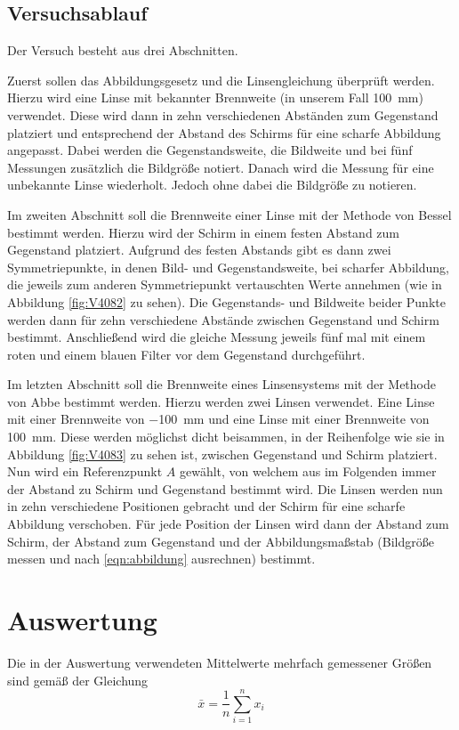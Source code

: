 \documentclass[
  parskip=half,
  bibliography=totoc,     %
  captions=tableheading,  %
  titlepage=firstiscover, %
]{scrartcl}
\begin{document}
\subsection{Versuchsablauf}
Der Versuch besteht aus drei Abschnitten.

\noindent
Zuerst sollen das Abbildungsgesetz und die Linsengleichung überprüft werden.
Hierzu wird eine Linse mit bekannter Brennweite (in unserem Fall \SI{100}{\milli\meter})
verwendet. Diese wird dann in zehn verschiedenen Abständen zum Gegenstand
platziert und entsprechend der Abstand des Schirms für eine scharfe Abbildung
angepasst. Dabei werden die Gegenstandsweite, die Bildweite und bei fünf
Messungen zusätzlich die Bildgröße notiert.
Danach wird die Messung für eine unbekannte Linse wiederholt. Jedoch ohne
dabei die Bildgröße zu notieren.

\noindent
Im zweiten Abschnitt soll die Brennweite einer Linse mit der Methode von
Bessel bestimmt werden. Hierzu wird der Schirm in einem festen Abstand
zum Gegenstand platziert. Aufgrund des festen Abstands gibt es dann zwei
Symmetriepunkte, in denen Bild- und Gegenstandsweite, bei scharfer
Abbildung, die jeweils zum anderen Symmetriepunkt vertauschten Werte
annehmen (wie in Abbildung \ref{fig:V4082} zu sehen). Die Gegenstands-
und Bildweite beider Punkte werden dann für zehn verschiedene Abstände
zwischen Gegenstand und Schirm bestimmt. Anschließend wird die gleiche
Messung jeweils fünf mal mit einem roten und einem blauen Filter vor
dem Gegenstand durchgeführt.

\noindent
Im letzten Abschnitt soll die Brennweite eines Linsensystems mit der Methode
von Abbe bestimmt werden. Hierzu werden zwei Linsen verwendet. Eine Linse
mit einer Brennweite von \SI{-100}{\milli\meter} und eine Linse mit einer
Brennweite von \SI{100}{\milli\meter}. Diese werden möglichst dicht beisammen,
in der Reihenfolge wie sie in Abbildung \ref{fig:V4083} zu sehen ist, zwischen
Gegenstand und Schirm platziert. Nun wird ein Referenzpunkt $A$ gewählt,
von welchem aus im Folgenden immer der Abstand zu Schirm und Gegenstand
bestimmt wird. Die Linsen werden nun in zehn verschiedene Positionen gebracht
und der Schirm für eine scharfe Abbildung verschoben.
Für jede Position der Linsen wird dann der Abstand zum Schirm, der Abstand zum
Gegenstand und der Abbildungsmaßstab (Bildgröße messen und nach \eqref{eqn:abbildung}
ausrechnen) bestimmt.
\section{Auswertung}
\label{sec:auswertung}
Die in der Auswertung verwendeten Mittelwerte mehrfach gemessener Größen sind gemäß der
Gleichung
%
\begin{equation}
    \bar{x}=\frac{1}{n}\sum_{i=1}^n x_i
    \label{eq:mittelwert}
\end{equation}
\end{document}
